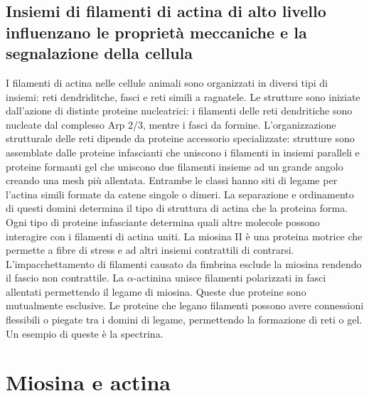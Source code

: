 \subsection{Insiemi di filamenti di actina di alto livello influenzano le propriet\`a meccaniche e la segnalazione della cellula}
I filamenti di actina nelle cellule animali sono organizzati in diversi tipi di insiemi: reti dendriditche, fasci e reti simili a ragnatele. Le strutture sono iniziate dall'azione
di distinte proteine nucleatrici: i filamenti delle reti dendritiche sono nucleate dal complesso Arp 2/3, mentre i fasci da formine. L'organizzazione strutturale delle reti dipende
da proteine accessorio specializzate: strutture sono assemblate dalle proteine infascianti che uniscono i filamenti in insiemi paralleli e proteine formanti gel che uniscono due 
filamenti insieme ad un grande angolo creando una mesh pi\`u allentata. Entrambe le classi hanno siti di legame per l'actina simili formate da catene singole o dimeri. La separazione
e ordinamento di questi domini determina il tipo di struttura di actina che la proteina forma. Ogni tipo di proteine infasciante determina quali altre molecole possono interagire con
i filamenti di actina uniti. La miosina II \`e una proteina motrice che permette a fibre di stress e ad altri insiemi contrattili di contrarsi. L'impacchettamento di filamenti causato
da fimbrina esclude la miosina rendendo il fascio non contrattile. La $\alpha$-actinina unisce filamenti polarizzati in fasci allentati permettendo il legame di miosina. Queste due 
proteine sono mutualmente esclusive. Le proteine che legano filamenti possono avere connessioni flessibili o piegate tra i domini di legame, permettendo la formazione di reti o gel. Un
esempio di queste \`e la spectrina. 
\section{Miosina e actina}
